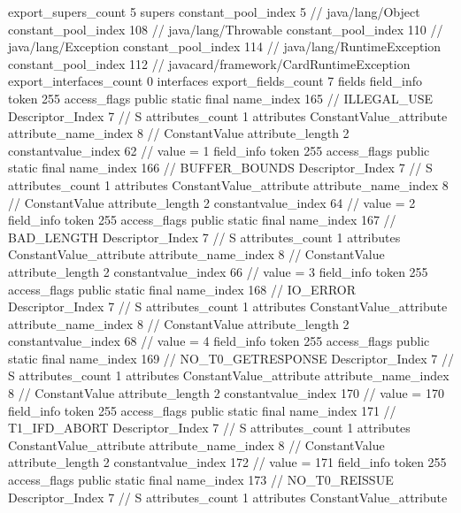 {{{			export_supers_count	5
			supers {
				constant_pool_index	5		// java/lang/Object
				constant_pool_index	108		// java/lang/Throwable
				constant_pool_index	110		// java/lang/Exception
				constant_pool_index	114		// java/lang/RuntimeException
				constant_pool_index	112		// javacard/framework/CardRuntimeException
			}
			export_interfaces_count	0
			interfaces {
			}
			export_fields_count	7
			fields {
			field_info {
				token	255
				access_flags	public static final
				name_index	165		// ILLEGAL_USE
				Descriptor_Index	7		// S
				attributes_count	1
				attributes {
				ConstantValue_attribute {
					attribute_name_index	8		// ConstantValue
					attribute_length	2
					constantvalue_index	62		// value = 1
				}
				}
			}
			field_info {
				token	255
				access_flags	public static final
				name_index	166		// BUFFER_BOUNDS
				Descriptor_Index	7		// S
				attributes_count	1
				attributes {
				ConstantValue_attribute {
					attribute_name_index	8		// ConstantValue
					attribute_length	2
					constantvalue_index	64		// value = 2
				}
				}
			}
			field_info {
				token	255
				access_flags	public static final
				name_index	167		// BAD_LENGTH
				Descriptor_Index	7		// S
				attributes_count	1
				attributes {
				ConstantValue_attribute {
					attribute_name_index	8		// ConstantValue
					attribute_length	2
					constantvalue_index	66		// value = 3
				}
				}
			}
			field_info {
				token	255
				access_flags	public static final
				name_index	168		// IO_ERROR
				Descriptor_Index	7		// S
				attributes_count	1
				attributes {
				ConstantValue_attribute {
					attribute_name_index	8		// ConstantValue
					attribute_length	2
					constantvalue_index	68		// value = 4
				}
				}
			}
			field_info {
				token	255
				access_flags	public static final
				name_index	169		// NO_T0_GETRESPONSE
				Descriptor_Index	7		// S
				attributes_count	1
				attributes {
				ConstantValue_attribute {
					attribute_name_index	8		// ConstantValue
					attribute_length	2
					constantvalue_index	170		// value = 170
				}
				}
			}
			field_info {
				token	255
				access_flags	public static final
				name_index	171		// T1_IFD_ABORT
				Descriptor_Index	7		// S
				attributes_count	1
				attributes {
				ConstantValue_attribute {
					attribute_name_index	8		// ConstantValue
					attribute_length	2
					constantvalue_index	172		// value = 171
				}
				}
			}
			field_info {
				token	255
				access_flags	public static final
				name_index	173		// NO_T0_REISSUE
				Descriptor_Index	7		// S
				attributes_count	1
				attributes {
				ConstantValue_attribute {
}}}}}}}
